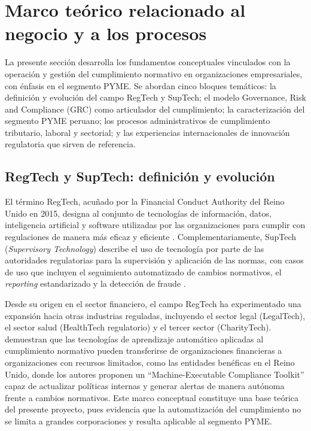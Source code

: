 \documentclass[12pt,a4paper,oneside]{report}
\begin{document}
\section{Marco teórico relacionado al negocio y a los procesos}\label{sec:marco-teorico-negocio-procesos}

La presente sección desarrolla los fundamentos conceptuales vinculados con la operación y gestión del cumplimiento normativo en organizaciones empresariales, con énfasis en el segmento PYME. Se abordan cinco bloques temáticos: la definición y evolución del campo RegTech y SupTech; el modelo Governance, Risk and Compliance (GRC) como articulador del cumplimiento; la caracterización del segmento PYME peruano; los procesos administrativos de cumplimiento tributario, laboral y sectorial; y las experiencias internacionales de innovación regulatoria que sirven de referencia.

\subsection{RegTech y SupTech: definición y evolución}\label{subsec:regtech-suptech-definicion-evolucion}

El término RegTech, acuñado por la Financial Conduct Authority del Reino Unido en 2015, designa al conjunto de tecnologías de información, datos, inteligencia artificial y software utilizadas por las organizaciones para cumplir con regulaciones de manera más eficaz y eficiente \parencite{elkhoury2025}. Complementariamente, SupTech (\textit{Supervisory Technology}) describe el uso de tecnología por parte de las autoridades regulatorias para la supervisión y aplicación de las normas, con casos de uso que incluyen el seguimiento automatizado de cambios normativos, el \textit{reporting} estandarizado y la detección de fraude \parencite{chao2022}.

Desde su origen en el sector financiero, el campo RegTech ha experimentado una expansión hacia otras industrias reguladas, incluyendo el sector legal (LegalTech), el sector salud (HealthTech regulatorio) y el tercer sector (CharityTech). \textcite{singh2022} demuestran que las tecnologías de aprendizaje automático aplicadas al cumplimiento normativo pueden transferirse de organizaciones financieras a organizaciones con recursos limitados, como las entidades benéficas en el Reino Unido, donde los autores proponen un \enquote{Machine-Executable Compliance Toolkit} capaz de actualizar políticas internas y generar alertas de manera autónoma frente a cambios normativos. Este marco conceptual constituye una base teórica del presente proyecto, pues evidencia que la automatización del cumplimiento no se limita a grandes corporaciones y resulta aplicable al segmento PYME.
\end{document}
